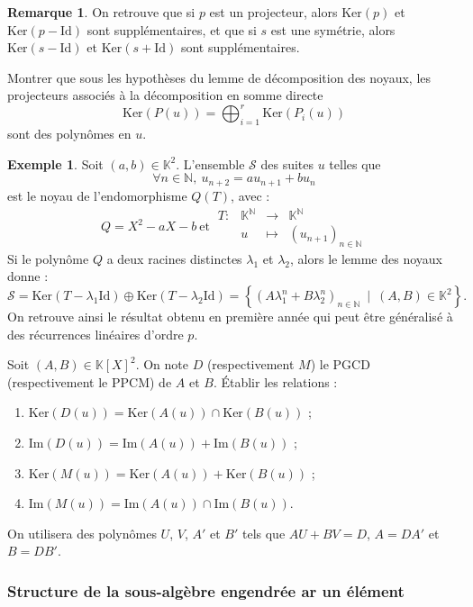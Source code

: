 \documentclass[french]{article}
\newcommand{\N}{\mathbb{N}}
\newcommand{\K}{\mathbb{K}}
\renewcommand{\ker}{\text{Ker}}
\theoremstyle{plain}
\theoremstyle{definition}
\newtheorem*{ex}{Exemple}
\newtheorem*{rmq}{Remarque}
\theoremstyle{remark}
\begin{document}
\begin{rmq}
	On retrouve que si $p$ est un projecteur, alors $\ker(p)$ et $\ker(p-\text{Id})$ sont supplémentaires, et que si $s$ est une symétrie, alors $\ker(s-\text{Id})$ et $\ker(s+\text{Id})$ sont supplémentaires.
\end{rmq}

\begin{exo}
	Montrer que sous les hypothèses du lemme de décomposition des noyaux, les projecteurs associés à la décomposition en somme directe $$\ker(P(u))=\bigoplus_{i=1}^r\ker(P_i(u))$$ sont des polynômes en $u$.
\end{exo}

\begin{ex}
	Soit $(a,b)\in\K^2$. L'ensemble $\mathcal{S}$ des suites $u$ telles que $$\forall n\in\N,\ u_{n+2}=au_{n+1}+bu_n$$ est le noyau de l'endomorphisme $Q(T)$, avec : $$Q=X^2-aX-b\ \text{et}\ \begin{array}{lrcl}
		T:&\K^\N&\longrightarrow&\K^\N\\
		&u&\longmapsto&(u_{n+1})_{n\in\N}
	\end{array}$$ Si le polynôme $Q$ a deux racines distinctes $\lambda_1$ et $\lambda_2$, alors le lemme des noyaux donne : $$\mathcal{S}=\ker(T-\lambda_1\text{Id})\oplus\ker(T-\lambda_2\text{Id})=\left\{(A\lambda_1^n+B\lambda_2^n)_{n\in\N}\ \mid\ (A,B)\in\K^2\right\}.$$ On retrouve ainsi le résultat obtenu en première année qui peut être généralisé à des récurrences linéaires d'ordre $p$.
\end{ex}

\begin{exo}
	Soit $(A,B)\in\K[X]^2$. On note $D$ (respectivement $M$) le PGCD (respectivement le PPCM) de $A$ et $B$. Établir les relations :
	\begin{enumerate}
		\item $\ker(D(u))=\ker(A(u))\cap\ker(B(u))$ ;
		\item $\text{Im}(D(u))=\text{Im}(A(u))+\text{Im}(B(u))$ ;
		\item $\ker(M(u))=\ker(A(u))+\ker(B(u))$ ;
		\item $\text{Im}(M(u))=\text{Im}(A(u))\cap\text{Im}(B(u))$.
	\end{enumerate}
	On utilisera des polynômes $U$, $V$, $A'$ et $B'$ tels que $AU+BV=D$, $A=DA'$ et $B=DB'$.
\end{exo}

\subsubsection*{Structure de la sous-algèbre engendrée ar un élément}
\end{document}
